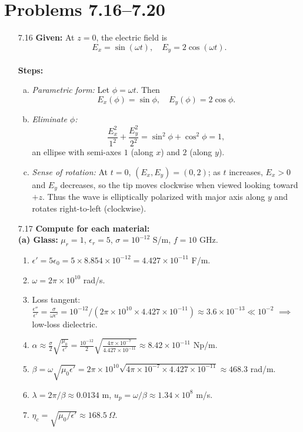 \section*{Problems 7.16--7.20}
\begin{enumerate}

\item[7.16] \textbf{Given:} At $z=0$, the electric field is
\[E_x=\sin(\omega t),\quad E_y=2\cos(\omega t).\]
\\
\textbf{Steps:}
\begin{enumerate}[(a)]
  \item \emph{Parametric form:} Let $\phi=\omega t$.  Then
  \[E_x(\phi)=\sin\phi,\quad E_y(\phi)=2\cos\phi.\]
  \item \emph{Eliminate $\phi$:}
  \[\frac{E_x^2}{1^2}+\frac{E_y^2}{2^2}=\sin^2\phi+\cos^2\phi=1,\]
  an ellipse with semi-axes $1$ (along $x$) and $2$ (along $y$).
  \item \emph{Sense of rotation:} At $t=0$, $(E_x,E_y)=(0,2)$; as $t$ increases, $E_x>0$ and $E_y$ decreases, so the tip moves clockwise when viewed looking toward $+z$.  Thus the wave is elliptically polarized with major axis along $y$ and rotates right-to-left (clockwise).
\end{enumerate}

\item[7.17] \textbf{Compute for each material:}
\\
\textbf{(a) Glass:} $\mu_r=1$, $\epsilon_r=5$, $\sigma=10^{-12}$ S/m, $f=10$ GHz.
\begin{enumerate}[(1)]
  \item $\epsilon'=5\epsilon_0=5\times8.854\times10^{-12}=4.427\times10^{-11}$ F/m.
  \item $\omega=2\pi\times10^{10}$ rad/s.
  \item Loss tangent: $\frac{\epsilon''}{\epsilon'}=\frac{\sigma}{\omega\epsilon'}=10^{-12}/(2\pi\times10^{10}\times4.427\times10^{-11})\approx3.6\times10^{-13}\ll10^{-2}$ $\implies$ low-loss dielectric.
  \item $\alpha\approx\frac{\sigma}{2}\sqrt{\frac{\mu_0}{\epsilon'}}=\tfrac{10^{-12}}2\sqrt{\tfrac{4\pi\times10^{-7}}{4.427\times10^{-11}}}\approx8.42\times10^{-11}$ Np/m.
  \item $\beta=\omega\sqrt{\mu_0\epsilon'}=2\pi\times10^{10}\sqrt{4\pi\times10^{-7}\times4.427\times10^{-11}}\approx468.3$ rad/m.
  \item $\lambda=2\pi/\beta\approx0.0134$ m, \quad $u_p=\omega/\beta\approx1.34\times10^8$ m/s.
  \item $\eta_c=\sqrt{\mu_0/\epsilon'}\approx168.5\ \Omega$.
\end{enumerate}


\end{enumerate}
